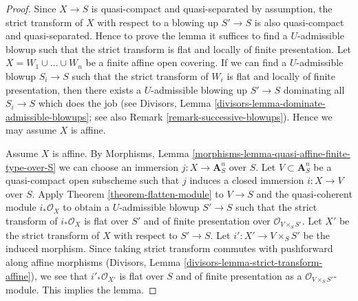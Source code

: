 \documentclass[10pt,a4paper]{amsart}
\theoremstyle{plain}
\theoremstyle{definition}
\theoremstyle{remark}
\numberwithin{equation}{subsection}
\begin{document}
\begin{proof}
Since $X \to S$ is quasi-compact and quasi-separated by assumption,
the strict transform of $X$ with respect to a blowing up $S' \to S$
is also quasi-compact and quasi-separated. Hence to prove the lemma
it suffices to find a $U$-admissible blowup such that the strict
transform is flat and locally of finite presentation.
Let $X = W_1 \cup \ldots \cup W_n$ be a finite affine open covering.
If we can find a $U$-admissible blowup $S_i \to S$ such that the
strict transform of $W_i$ is flat and locally of finite presentation,
then there exists a $U$-admissible blowing up $S' \to S$ dominating
all $S_i \to S$ which does the job (see
Divisors, Lemma \ref{divisors-lemma-dominate-admissible-blowups};
see also Remark \ref{remark-successive-blowups}).
Hence we may assume $X$ is affine.

\medskip\noindent
Assume $X$ is affine. By
Morphisms, Lemma \ref{morphisms-lemma-quasi-affine-finite-type-over-S}
we can choose an immersion $j : X \to \mathbf{A}^n_S$ over $S$.
Let $V \subset \mathbf{A}^n_S$ be a quasi-compact open subscheme
such that $j$ induces a closed immersion $i : X \to V$ over $S$. Apply
Theorem \ref{theorem-flatten-module}
to $V \to S$ and the quasi-coherent module $i_*\mathcal{O}_X$
to obtain a $U$-admissible blowup $S' \to S$ such that the strict
transform of $i_*\mathcal{O}_X$ is flat over $S'$ and of finite presentation
over $\mathcal{O}_{V \times_S S'}$. Let $X'$ be the strict transform
of $X$ with respect to $S' \to S$. Let $i' : X' \to V \times_S S'$
be the induced morphism.
Since taking strict transform commutes with pushforward along affine
morphisms (Divisors, Lemma \ref{divisors-lemma-strict-transform-affine}),
we see that $i'_*\mathcal{O}_{X'}$ is flat over $S$ and of
finite presentation as a $\mathcal{O}_{V \times_S S'}$-module.
This implies the lemma.
\end{proof}
\end{document}
